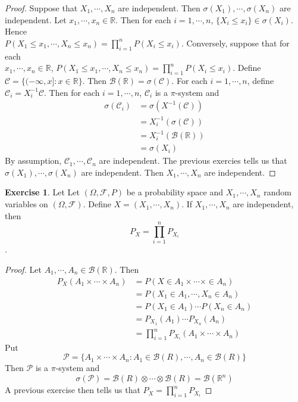 \documentclass[12pt]{amsart}
\theoremstyle{definition}
\newtheorem{ex}[definition]{Exercise}
\newcommand{\sig}{\sigma}
\newcommand{\Om}{\Omega}
\newcommand{\R}{\mathbb{R}}
\newcommand{\MC}{\mathcal{C}}
\newcommand{\MB}{\mathcal{B}}
\newcommand{\MF}{\mathcal{F}}
\newcommand{\MP}{\mathcal{P}}
\begin{document}
	\begin{proof}
		Suppose that $X_1, \cdots, X_n$ are independent. Then $\sig(X_1), \cdots, \sig(X_n)$ are independent. Let $x_1, \cdots, x_n \in \R$. Then for each $i=1, \cdots, n$, $\{X_i \leq x_i\} \in \sigma(X_i)$. Hence \\$P(X_1 \leq x_1, \cdots, X_n \leq x_n ) = \prod\limits_{i=1}^nP(X_i \leq x_i)$. Conversely, suppose that for each \\$x_1, \cdots, x_n \in \R$, $P(X_1 \leq x_1, \cdots, X_n \leq x_n ) = \prod\limits_{i=1}^nP(X_i \leq x_i)$. Define $\MC = \{ (-\infty, x]: x \in \R \}$. Then $\MB(\R) = \sig(\MC)$. For each $i =1, \cdots, n$, define $\MC_i = X_i^{-1}\MC$. Then for each $i =1, \cdots, n$, $\MC_i$ is a $\pi$-system and 
		\begin{align*}
			\sig(\MC_i) 
			&= \sig(X^{-1}(\MC)) \\
			&= X_i^{-1}(\sig(\MC)) \\
			&= X_i^{-1}(\MB(\R)) \\
			&= \sig(X_i)
		\end{align*}
		By assumption, $\MC_1, \cdots, \MC_n$ are independent. The previous exercies tells us that $\sig(X_1), \cdots, \sig(X_n)$ are independent. Then $X_1, \cdots, X_n$ are independent. 
	\end{proof}
	
	\begin{ex}
		Let Let $(\Om, \MF, P)$ be a probability space and $X_1, \cdots, X_n$ random variables on $(\Om, \MF)$. Define $X = (X_1, \cdots, X_n)$. If $X_1, \cdots, X_n$ are independent, then $$P_{X} = \prod\limits_{i=1}^nP_{X_i}$$.
	\end{ex}
	
	\begin{proof}
		Let $A_1, \cdots, A_n \in \MB(\R)$. Then 
		\begin{align*}
			P_X(A_1 \times \cdots \times A_n) 
			&= P(X \in A_1 \times \cdots \times \in A_n)\\
			&= P(X_1 \in A_1, \cdots, X_n \in A_n) \\
			&= P(X_1 \in A_1) \cdots P(X_n \in A_n) \\
			&= P_{X_1}(A_1) \cdots P_{X_n}(A_n) \\
			&= \prod_{i=1}^nP_{X_i}(A_1 \times \cdots \times  A_n)
		\end{align*}
		Put $$\MP = \{ A_1 \times \cdots \times A_n: A_1 \in \MB(R), \cdots, A_n \in \MB(R) \}$$ Then $\MP$ is a $\pi$-system and $$\sig(\MP) = \MB(R) \otimes \cdots \otimes \MB(R) = \MB(\R^n)$$
		A previous exercise then tells us that $P_X = \prod\limits_{i=1}^nP_{X_i}$ 
	\end{proof}
	
\end{document}
